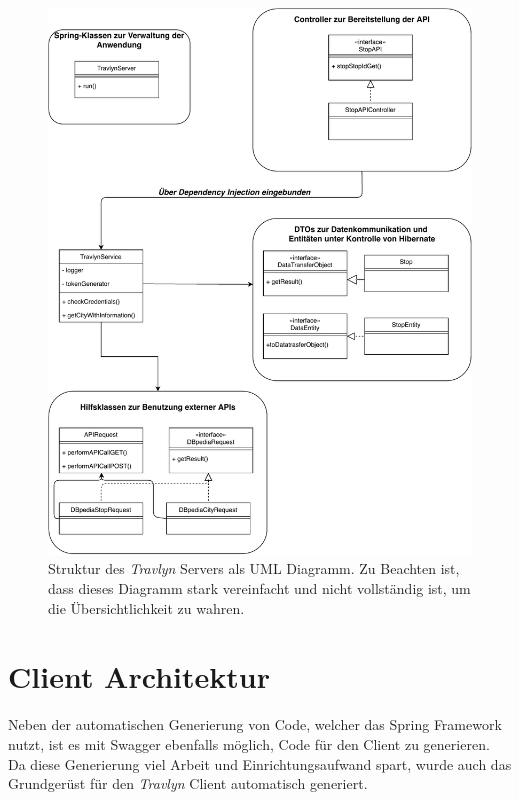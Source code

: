 	
	\begin{figure}[ht!]
		\centering
		\includegraphics[width=1\textwidth]{images/UML_Diagram.pdf}
		\caption{Struktur des \textit{Travlyn} Servers als UML Diagramm. Zu Beachten ist, dass dieses Diagramm stark vereinfacht und nicht vollständig ist, um die Übersichtlichkeit zu wahren.}
		\label{fig:UML}
	\end{figure}

	\clearpage

	
	\section{Client Architektur} %
		
		Neben der automatischen Generierung von Code, welcher das Spring Framework nutzt, ist es mit Swagger ebenfalls möglich, Code für den Client zu generieren. Da diese Generierung viel Arbeit und Einrichtungsaufwand spart, wurde auch das Grundgerüst für den \textit{Travlyn} Client automatisch generiert.
		
